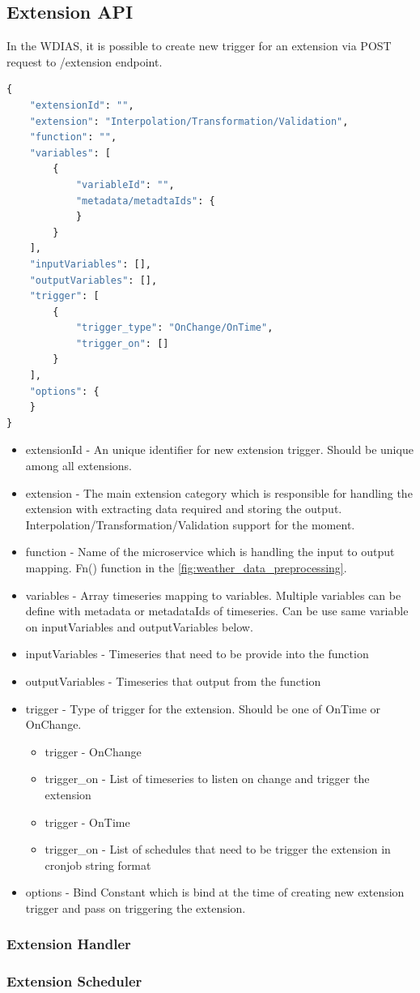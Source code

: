 \subsection{Extension API}
In the WDIAS, it is possible to create new trigger for an extension via POST request to /extension endpoint.
\begin{lstlisting}[language=Python]
{
    "extensionId": "",
    "extension": "Interpolation/Transformation/Validation",
    "function": "",
    "variables": [
        {
            "variableId": "",
            "metadata/metadtaIds": {
            }
        }
    ],
    "inputVariables": [],
    "outputVariables": [],
    "trigger": [
        {
            "trigger_type": "OnChange/OnTime",
            "trigger_on": []
        }
    ],
    "options": {
    }
}
\end{lstlisting}
\begin{itemize}
    \item extensionId - An unique identifier for new extension trigger. Should be unique among all extensions.
    \item extension - The main extension category which is responsible for handling the extension with extracting data required and storing the output. Interpolation/Transformation/Validation support for the moment.
    \item function - Name of the microservice which is handling the input to output mapping. Fn() function in the \ref{fig:weather_data_preprocessing}.
    \item variables - Array timeseries mapping to variables. Multiple variables can be define with metadata or metadataIds of timeseries. Can be use same variable on inputVariables and outputVariables below.
    \item inputVariables - Timeseries that need to be provide into the function
    \item outputVariables - Timeseries that output from the function
    \item trigger - Type of trigger for the extension. Should be one of OnTime or OnChange.
    \begin{itemize}
        \item trigger - OnChange
        \item trigger\_on - List of timeseries to listen on change and trigger the extension
    \end{itemize}
    \begin{itemize}
        \item trigger - OnTime
        \item trigger\_on - List of schedules that need to be trigger the extension in cronjob string format
    \end{itemize}
    \item options - Bind Constant which is bind at the time of creating new extension trigger and pass on triggering the extension.
\end{itemize}

\subsubsection{Extension Handler}

\subsubsection{Extension Scheduler}
